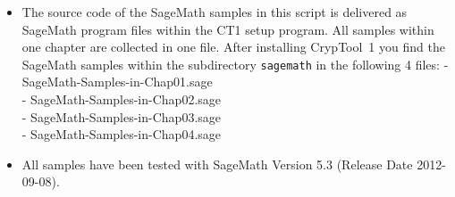 \documentclass[a4paper,11pt,oneside,ngerman,english]{book}  %
\begin{document}
  \clearpage{}
\endgroup


\clearpage{}
{}
\label{sc:List-of-Quotes}


\clearpage{}
{}
\label{sc:List-of-OpenSSL-Code-Examples}


\clearpage{}
{}
\label{sc:List-of-Sage-Code-Examples}

\vspace{30pt}
\begin{itemize}
  \item The source code of the SageMath samples in this script is delivered as
        SageMath program files within the CT1 setup program.
        All samples within one chapter are collected in one file.
        After installing CrypTool~1  you find
        the SageMath samples within the subdirectory \verb#sagemath# in the
        following 4 files:
        - SageMath-Samples-in-Chap01.sage \\
        - SageMath-Samples-in-Chap02.sage \\
        - SageMath-Samples-in-Chap03.sage \\
        - SageMath-Samples-in-Chap04.sage
  \item All samples have been tested with SageMath Version 5.3 (Release Date 2012-09-08).
\end{itemize}



\begin{bibunit}[babplain]
\nocite{*}
\renewcommand{\bibname}{All References from All Chapters (numbered by babplain)}
\putbib[../de/references]
\end{bibunit}

\begin{bibunit}[babalpha]
\nocite{*}
\renewcommand{\bibname}{All References from All Chapters (sorted by babalpha)}
\putbib[../de/references]
\end{bibunit}
\end{document}
